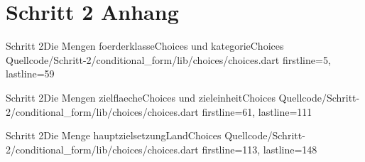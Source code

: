 \section{Schritt 2 Anhang} 
\label{appendix:Schritt2Anhang}

\begin{alexlisting}{Schritt 2}{Die Mengen foerderklasseChoices und kategorieChoices }
    {Quellcode/Schritt-2/conditional_form/lib/choices/choices.dart}
    {firstline=5, lastline=59}
    \label{lst:Schritt2FoerderklasseChoicesKategorieChoices}
\end{alexlisting}

\begin{alexlisting}{Schritt 2}{Die Mengen zielflaecheChoices und zieleinheitChoices}
    {Quellcode/Schritt-2/conditional_form/lib/choices/choices.dart}
    {firstline=61, lastline=111}
    \label{lst:Schritt2ZielflaecheChoicesZieleinheitChoices}
\end{alexlisting}

\begin{alexlisting}{Schritt 2}{Die Menge hauptzielsetzungLandChoices}
    {Quellcode/Schritt-2/conditional_form/lib/choices/choices.dart}
    {firstline=113, lastline=148}
    \label{lst:Schritt2hauptzielsetzungLandChoices}
\end{alexlisting}